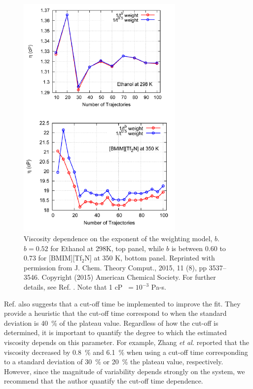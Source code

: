 \documentclass[9pt,bestpractices]{livecoms}
\begin{document}


\begin{figure}[htb!]
	\centering
	\includegraphics[width=3.2in]{ZhangFig7_12.png}
	\caption{Viscosity dependence on the exponent of the weighting model, $b$. $b = 0.52$ for Ethanol at 298K, top panel, while $b$ is between $0.60$ to $0.73$ for [BMIM][Tf$_2$N] at 350 K, bottom panel. Reprinted with permission from J. Chem. Theory Comput., 2015, 11 (8), pp 3537–3546. Copyright (2015) American Chemical Society. For further details, see Ref. \cite{Zhang2015}. Note that 1 cP $\ = 10^{-3}$ Pa-s.}
	\label{fig:ZhangFig7_12}
\end{figure}

Ref. \cite{Zhang2015} also suggests that a cut-off time be implemented to improve the fit. They provide a heuristic that the cut-off time correspond to when the standard deviation is 40~\% of the plateau value. Regardless of how the cut-off is determined, it is important to quantify the degree to which the estimated viscosity depends on this parameter. For example, Zhang \textit{et al.} reported that the viscosity decreased by 0.8~\% and 6.1~\% when using a cut-off time corresponding to a standard deviation of 30~\% or 20~\% the plateau value, respectively. However, since the magnitude of variability depends strongly on the system, we recommend that the author quantify the cut-off time dependence.
\end{document}
